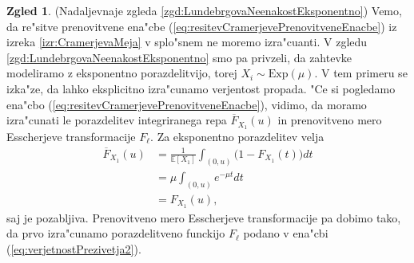 \documentclass[12pt, a4paper, reqno]{amsart}
\theoremstyle{definition}
\newtheorem{zgled}[definicija]{Zgled}
\theoremstyle{plain}
\newcommand{\E}{\mathbb{E}}
\newcommand{\1}{\mathds{1}}
\begin{document}
            \begin{zgled}(Nadaljevnaje zgleda \ref{zgd:LundebrgovaNeenakostEksponentno})
                Vemo, da re"sitve prenovitvene ena"cbe (\ref{eq:resitevCramerjevePrenovitveneEnacbe}) 
                iz izreka \ref{izr:CramerjevaMeja} v splo"snem ne moremo izra"cuanti.
                V zgledu \ref{zgd:LundebrgovaNeenakostEksponentno} smo pa privzeli, da zahtevke modeliramo 
                z eksponentno porazdelitvijo, torej $X_i\sim\text{Exp}(\mu)$. 
                V tem primeru se izka"ze, da lahko eksplicitno izra"cunamo verjentost propada.
                "Ce si pogledamo ena"cbo (\ref{eq:resitevCramerjevePrenovitveneEnacbe}), vidimo, da moramo 
                izra"cunati le porazdelitev integriranega repa $\overline{F}_{X_1}(u)$ in 
                prenovitveno mero Esscherjeve transformacije $F_\ell$. Za eksponentno porazdelitev
                velja
                \begin{align*}
                    \overline{F}_{X_1}(u)   &= \frac{1}{\E\left[X_1\right]}\int_{(0, u)}\bigl(1 - F_{X_1}(t)\bigr)dt \\
                                            &= \mu\int_{(0, u)}e^{-\mu t}dt \\
                                            &= F_{X_1}(u),
                \end{align*}
                saj je pozabljiva. Prenovitveno mero Esscherjeve transformacije pa dobimo tako, 
                da prvo izra"cunamo porazdelitveno funckijo $F_\ell$ podano v ena"cbi (\ref{eq:verjetnostPrezivetja2}). 


\end{zgled}
\end{document}
